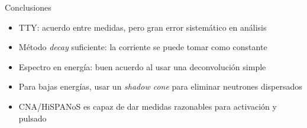 \documentclass[11pt]{beamer}
\begin{document}
\begin{frame}{Conclusiones}
	\begin{itemize}
		\item TTY: acuerdo entre medidas, pero gran error sistemático en análisis
		\item Método \textit{decay} suficiente: la corriente se puede tomar como constante
		\item Espectro en energía: buen acuerdo al usar una deconvolución simple
		\item Para bajas energías, usar un \textit{shadow cone} para eliminar neutrones dispersados
		\item CNA/HiSPANoS es capaz de dar medidas razonables para activación y pulsado
	\end{itemize}
\end{frame}
\end{document}
